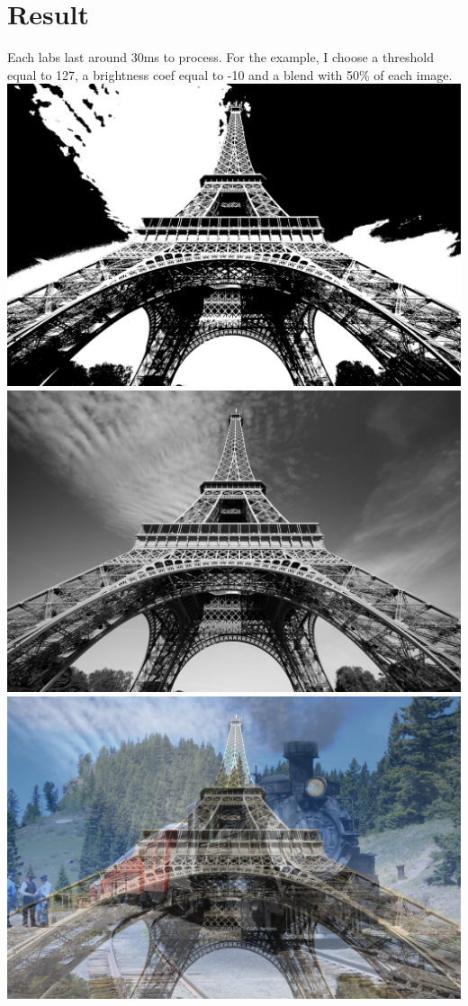 \documentclass{article}
\begin{document}
\section{Result}
Each labs last around 30ms to process. For the example, I choose a threshold equal to 127, a brightness coef equal to -10 and a blend with 50\% of each image.
\newline
\includegraphics[width=\textwidth]{labwork6-bin-gpu-out.jpg}
\newline
\includegraphics[width=\textwidth]{labwork6-bright-gpu-out.jpg}
\newline
\includegraphics[width=\textwidth]{labwork6-blend-gpu-out.jpg}

\end{document}
